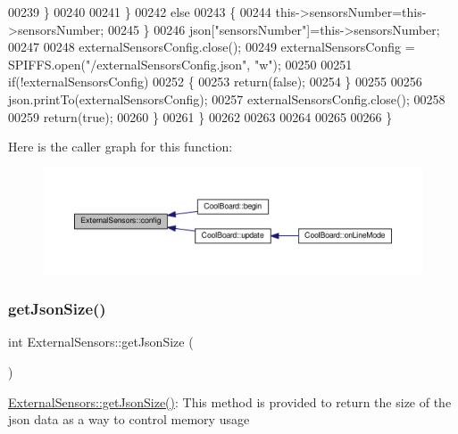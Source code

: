 \begin{DoxyCode}
00239                 \}
00240  
00241             \}
00242             \textcolor{keywordflow}{else}
00243             \{
00244                 this->sensorsNumber=this->sensorsNumber;
00245             \}
00246             json[\textcolor{stringliteral}{"sensorsNumber"}]=this->sensorsNumber;
00247 
00248             externalSensorsConfig.close();
00249             externalSensorsConfig = SPIFFS.open(\textcolor{stringliteral}{"/externalSensorsConfig.json"}, \textcolor{stringliteral}{"w"});
00250 
00251             \textcolor{keywordflow}{if}(!externalSensorsConfig)
00252             \{
00253                 \textcolor{keywordflow}{return}(\textcolor{keyword}{false});
00254             \}
00255             
00256             json.printTo(externalSensorsConfig);
00257             externalSensorsConfig.close();
00258             
00259             \textcolor{keywordflow}{return}(\textcolor{keyword}{true}); 
00260         \}
00261     \}   
00262     
00263 
00264 
00265 
00266 \}
\end{DoxyCode}
Here is the caller graph for this function\+:\nopagebreak
\begin{figure}[H]
\begin{center}
\leavevmode
\includegraphics[width=350pt]{class_external_sensors_a862a4bd11346b37270d0244c2adabe5a_icgraph}
\end{center}
\end{figure}
\mbox{\label{class_external_sensors_a8e3a93efa8f5a0477f300e26084b6625}} 
\subsubsection{\texorpdfstring{get\+Json\+Size()}{getJsonSize()}}
{\footnotesize\ttfamily int External\+Sensors\+::get\+Json\+Size (\begin{DoxyParamCaption}{ }\end{DoxyParamCaption})}

\hyperlink{class_external_sensors_a8e3a93efa8f5a0477f300e26084b6625}{External\+Sensors\+::get\+Json\+Size()}\+: This method is provided to return the size of the json data as a way to control memory usage


